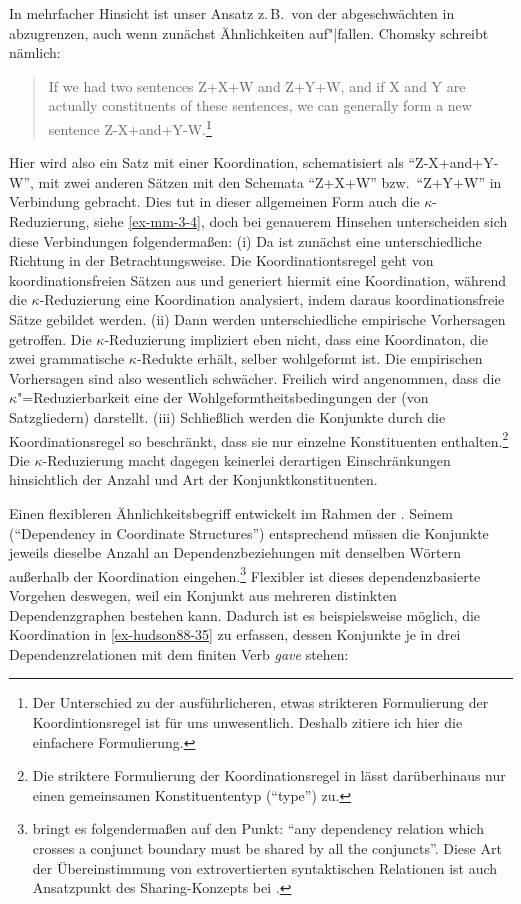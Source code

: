 In mehrfacher Hinsicht ist unser Ansatz z.\,B.\  von der abgeschwächten  in \citet[35]{Chomsky:57} abzugrenzen, auch wenn zunächst Ähnlichkeiten auf"|fallen. Chomsky schreibt nämlich:
\begin{quote}
If we had two sentences Z+X+W and Z+Y+W, and if X and Y are actually constituents of these sentences, we can generally form a new sentence Z-X+and+Y-W.\footnote{Der Unterschied zu der ausführlicheren, etwas strikteren Formulierung der Koordintionsregel \citep[(26)]{Chomsky:57} ist für uns unwesentlich. Deshalb zitiere ich hier die einfachere Formulierung.}
\end{quote}
Hier wird also ein Satz mit einer Koordination, schematisiert als "`Z-X+and+Y-W"', mit zwei anderen Sätzen mit den Schemata "`Z+X+W"' bzw.\ "`Z+Y+W"' in Verbindung gebracht. Dies tut in dieser allgemeinen Form auch die $\kappa$-Reduzierung, siehe \ref{ex-mm-3-4}, doch bei genauerem Hinsehen unterscheiden sich diese Verbindungen folgenderma\ss en:
(i) Da ist zunächst eine unterschiedliche Richtung in der Betrachtungsweise. Die Koordinationtsregel geht von koordinationsfreien Sätzen aus und generiert hiermit eine Koordination, während die $\kappa$-Reduzierung eine Koordination analysiert, indem daraus koordinationsfreie Sätze gebildet werden. (ii) Dann werden unterschiedliche empirische Vorhersagen getroffen. Die $\kappa$-Reduzierung impliziert eben nicht, dass eine Koordinaton, die zwei grammatische $\kappa$-Redukte erhält, selber wohlgeformt ist. Die empirischen Vorhersagen sind also wesentlich schwächer. Freilich wird angenommen, dass die $\kappa$"=Reduzierbarkeit eine der Wohlgeformtheitsbedingungen der  (von Satzgliedern) darstellt. (iii) Schlie\ss lich werden die Konjunkte durch die Koordinationsregel so beschränkt, dass sie nur einzelne Konstituenten enthalten.\footnote{Die striktere Formulierung der Koordinationsregel in \citet[(26)]{Chomsky:57} lässt darüberhinaus nur einen gemeinsamen Konstituententyp ("`type"') zu.} Die $\kappa$-Reduzierung macht dagegen keinerlei derartigen Einschränkungen hinsichtlich der Anzahl und Art der Konjunktkonstituenten. 

Einen flexibleren Ähnlichkeitsbegriff entwickelt \cite{Hudson:88} im Rahmen der . Seinem  ("`Dependency in Coordinate Structures"') entsprechend müssen die Konjunkte jeweils dieselbe Anzahl an Dependenzbeziehungen mit denselben Wörtern au\ss erhalb der Koordination eingehen.\footnote{\citet[323]{Hudson:88} bringt es folgenderma\ss en auf den Punkt: "`any dependency relation which crosses a conjunct boundary must be shared by all the conjuncts"'. Diese Art der Übereinstimmung von extrovertierten syntaktischen Relationen ist auch Ansatzpunkt des Sharing-Konzepts bei \citet[35]{Johnson:04}. } Flexibler ist dieses dependenzbasierte Vorgehen deswegen, weil ein Konjunkt aus mehreren distinkten Dependenzgraphen bestehen kann. Dadurch ist es beispielsweise möglich, die Koordination in \ref{ex-hudson88-35} zu erfassen, dessen Konjunkte je in drei Dependenzrelationen mit dem finiten Verb {\it gave} stehen:   

